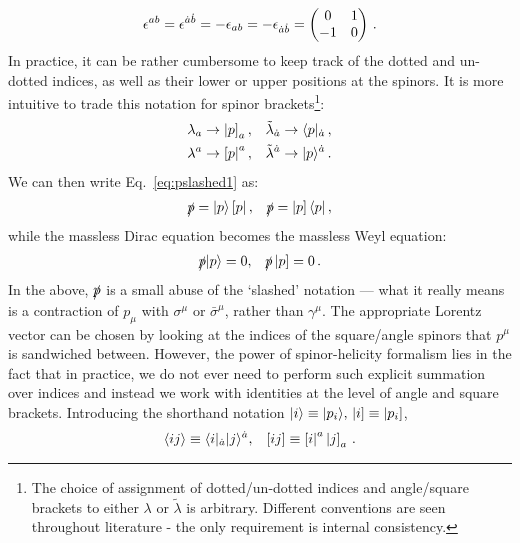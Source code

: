 \documentclass[main.tex]{subfiles}
\begin{document}
\begin{equation}
    \epsilon^{ab} = \epsilon^{\dot{a}\dot{b}} = -\epsilon_{ab} = -\epsilon_{\dot{a}\dot{b}} = 
    \begin{pmatrix}
        0 & 1 \\
        -1 & 0
    \end{pmatrix}\,.
\end{equation}
In practice, it can be rather cumbersome to keep track of the dotted and un-dotted indices, as well as their lower or upper positions at the spinors. It is more intuitive to trade this notation for spinor brackets\footnote{The choice of assignment of dotted/un-dotted indices and angle/square brackets to either $\lambda$ or $\tilde{\lambda}$ is arbitrary. Different conventions are seen throughout literature - the only requirement is internal consistency.}:
\begin{align} \label{eq:lambdatobraket}
    \lambda_a  &\rightarrow \left| p \right]_a,  &&\tilde{\lambda}_{\dot{a}} \rightarrow \langle p|_{\dot{a}}\,, \nonumber \\*
    \lambda^a  &\rightarrow \left[ p \right|^a,  &&\tilde{\lambda}^{\dot{a}} \rightarrow |p \rangle^{\dot{a}} \,.
\end{align}
We can then write Eq.~\ref{eq:pslashed1} as:
\begin{align} \label{eq:pslashed2}
    \slashed{p} = |p \rangle\left[ p \right|, && \slashed{p} = \left| p \right] \langle p| \,,
\end{align}
while the massless Dirac equation becomes the massless Weyl equation:
\begin{align} \label{eq:weyleq}
    \slashed{p}|p \rangle = 0, && \slashed{p}\left| p \right] = 0\,.
\end{align}
In the above, $\slashed{p}$ is a small abuse of the `slashed' notation --- what it really means is a contraction of $p_\mu$ with $\sigma^\mu$ or $\bar{\sigma}^\mu$, rather than $\gamma^\mu$. The appropriate Lorentz vector can be chosen by looking at the indices of the square/angle spinors that $p^\mu$ is sandwiched between. However, the power of spinor-helicity formalism lies in the fact that in practice, we do not ever need to perform such explicit summation over indices and instead we work with identities at the level of angle and square brackets. Introducing the shorthand notation $|i \rangle \equiv |p_i \rangle,\, \left| i \right] \equiv \left| p_i \right]$, 
\begin{align}
    \langle ij \rangle \equiv \langle i|_{\dot{a}} |j \rangle^{\dot{a}}, && [ ij ] \equiv \left[ i \right|^a \left| j \right]_a \,. 
\end{align}
\end{document}
